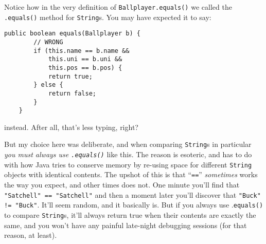 Notice how in the very definition of \texttt{Ballplayer.equals()} we called
the \texttt{.equals()} method for \texttt{String}s. You may have expected it
to say:

\begin{Verbatim}[fontsize=\scriptsize,samepage=true]
    public boolean equals(Ballplayer b) {
        // WRONG
        if (this.name == b.name &&
            this.uni == b.uni &&
            this.pos == b.pos) {
            return true;
        } else {
            return false;
        }
    }
\end{Verbatim}

instead. After all, that's less typing, right?

But my choice here was deliberate, and when comparing \texttt{String}s in
particular \textit{you must always use \texttt{.equals()}} like this. The
reason is esoteric, and has to do with how Java tries to conserve memory by
re-using space for different \texttt{String} objects with identical contents.
The upshot of this is that ``\texttt{==}'' \textit{sometimes} works the way you
expect, and other times does not. One minute you'll find that
\texttt{"Satchell" == "Satchell"} and then a moment later you'll discover that
\texttt{"Buck" != "Buck"}. It'll seem random, and it basically is. But if you
always use .\texttt{equals()} to compare \texttt{String}s, it'll always return
true when their contents are exactly the same, and you won't have any painful
late-night debugging sessions (for that reason, at least).

